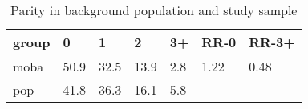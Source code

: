 \begin{table}[ht]
\centering
\begin{tabular}{lllllll}
  \hline
group & 0 & 1 & 2 & 3+ & RR-0 & RR-3+ \\ 
  \hline
moba & 50.9 & 32.5 & 13.9 & 2.8 & 1.22 & 0.48 \\ 
  pop & 41.8 & 36.3 & 16.1 & 5.8 &  &  \\ 
   \hline
\end{tabular}
\caption{Parity in background population and study sample} 
\label{table:parity}
\end{table}
